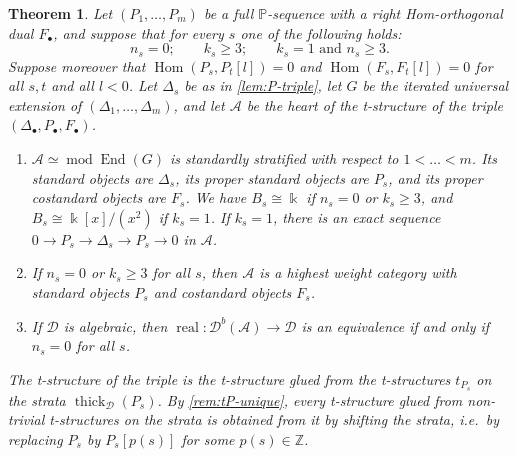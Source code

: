 \documentclass[11pt,reqno]{amsart}
\theoremstyle{plain}
\newtheorem{theorem}{Theorem}[section]
\theoremstyle{definition}
\theoremstyle{remark}
\newcommand{\kk}{\Bbbk}
\DeclareMathOperator{\Hom}{Hom}
\DeclareMathOperator{\End}{End}
\DeclareMathOperator{\real}{real}
\newcommand{\modd}{\operatorname{mod}}
\newcommand{\Db}{\mathcal{D}^b}
\newcommand{\thick}[2][\cD]{\operatorname{thick}_{#1}(#2)}
\newcommand{\cD}{\mathcal{D}}
\newcommand{\cA}{\mathcal{A}}
\begin{document}
\begin{theorem}\label{thm:Pseq}
Let $(P_1,\dots,P_m)$ be a full $\mathbb{P}$-sequence with a right Hom-orthogonal dual $F_\bullet$, and suppose that for every $s$ one of the following holds:
\[n_s=0;\qquad k_s\ge3;\qquad k_s=1\text{ and }n_s\ge3.\]
Suppose moreover that $\Hom(P_s,P_t[l])=0$ and $\Hom(F_s,F_t[l])=0$ for all $s,t$ and all $l<0$. Let $\Delta_s$ be as in \cref{lem:P-triple}, let $G$ be the iterated universal extension of $(\Delta_1,\dots,\Delta_m)$, and let $\cA$ be the heart of the t-structure of the triple $(\Delta_\bullet,P_\bullet,F_\bullet)$.
\begin{enumerate}
\item $\cA\simeq\modd\End(G)$ is standardly stratified with respect to $1<\dots<m$. Its standard objects are $\Delta_s$, its proper standard objects are $P_s$, and its proper costandard objects are $F_s$. We have $B_s\cong\kk$ if $n_s=0$ or $k_s\ge3$, and $B_s\cong\kk[x]/(x^2)$ if $k_s=1$. If $k_s=1$, there is an exact sequence $0\to P_s\to\Delta_s\to P_s\to0$ in $\cA$.
\item If $n_s=0$ or $k_s\ge3$ for all $s$, then $\cA$ is a highest weight category with standard objects $P_s$ and costandard objects $F_s$.
\item If $\cD$ is algebraic, then $\real\colon\Db(\cA)\to\cD$ is an equivalence if and only if $n_s=0$ for all $s$.
\end{enumerate}
The t-structure of the triple is the t-structure glued from the t-structures $t_{P_s}$ on the strata $\thick{P_s}$. By \cref{rem:tP-unique}, every t-structure glued from non-trivial t-structures on the strata is obtained from it by shifting the strata, i.e.\ by replacing $P_s$ by $P_s[p(s)]$ for some $p(s)\in\mathbb{Z}$.
\end{theorem}
\end{document}
